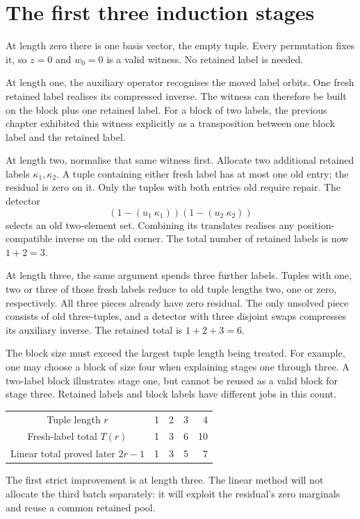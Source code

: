 \section{The first three induction stages}
At length zero there is one basis vector, the empty tuple. Every
permutation fixes it, so $z=0$ and $w_0=0$ is a valid witness. No
retained label is needed.

At length one, the auxiliary operator recognises the moved label
orbits. One fresh retained label realises its compressed inverse.
The witness can therefore be built on the block plus one retained
label. For a block of two labels, the previous chapter exhibited
this witness explicitly as a transposition between one block label
and the retained label.

At length two, normalise that same witness first. Allocate two
additional retained labels $\kappa_1,\kappa_2$. A tuple containing
either fresh label has at most one old entry; the residual is zero
on it. Only the tuples with both entries old require repair. The
detector
\[
                 (1-(u_1\ \kappa_1))(1-(u_2\ \kappa_2))
\]
selects an old two-element set. Combining its translates realises
any position-compatible inverse on the old corner. The total number
of retained labels is now $1+2=3$.

At length three, the same argument spends three further labels.
Tuples with one, two or three of those fresh labels reduce to old
tuple lengths two, one or zero, respectively. All three pieces
already have zero residual. The only unsolved piece consists of
old three-tuples, and a detector with three disjoint swaps compresses
its auxiliary inverse. The retained total is $1+2+3=6$.

The block size must exceed the largest tuple length being treated.
For example, one may choose a block of size four when explaining
stages one through three. A two-label block illustrates stage one,
but cannot be reused as a valid block for stage three. Retained
labels and block labels have different jobs in this count.

\begin{center}
\begin{tabular}{@{}c|rrrr@{}}
Tuple length $r$ &1&2&3&4\\
Fresh-label total $T(r)$ &1&3&6&10\\
Linear total proved later $2r-1$ &1&3&5&7
\end{tabular}
\end{center}
The first strict improvement is at length three. The linear method
will not allocate the third batch separately: it will exploit the
residual's zero marginals and reuse a common retained pool.

